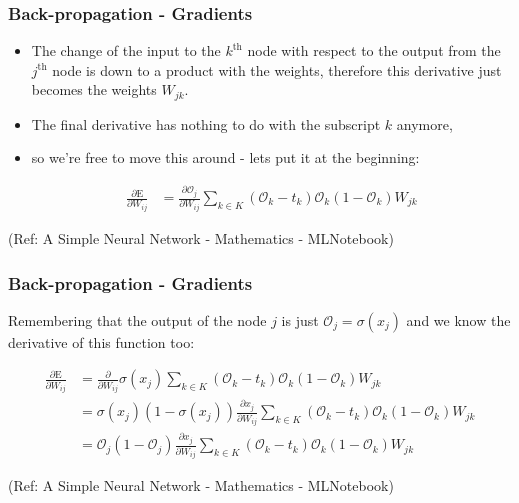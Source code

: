 \begin{frame}[fragile] \frametitle{Back-propagation - Gradients}

\begin{itemize}
\item The change of the input to the $k^{\text{th}}$ node with respect to the output from the $j^{\text{th}}$ 
node is down to a product with the weights, therefore this derivative just becomes the weights $W_{jk}$. 
\item The final derivative has nothing to do with the subscript $k$ anymore, 
\item so we’re free to move this around - lets put it at the beginning:

\begin{align}
\frac{\partial{\text{E}}}{\partial{W_{ij}}} &= \frac{\partial{\mathcal{O}_{j}}}{\partial{W_{ij}}}  \sum_{k \in K} \left( \mathcal{O}_{k} - t_{k} \right) \mathcal{O}_{k} \left( 1 - \mathcal{O}_{k} \right) W_{jk}
 \end{align}

\end{itemize}

\tiny{(Ref: A Simple Neural Network - Mathematics - MLNotebook)}
\end{frame}

\begin{frame}[fragile] \frametitle{Back-propagation - Gradients}

Remembering that the output of the node $j$ is just $\mathcal{O}_{j} = \sigma(x_{j})$ and we know the derivative of this function too:

\begin{align}
\frac{\partial{\text{E}}}{\partial{W_{ij}}} &= \frac{\partial{}}{\partial{W_{ij}}}\sigma(x_{j})  \sum_{k \in K} \left( \mathcal{O}_{k} - t_{k} \right) \mathcal{O}_{k} \left( 1 - \mathcal{O}_{k} \right) W_{jk} \\
&= \sigma(x_{j}) \left( 1 - \sigma(x_{j}) \right)  \frac{\partial{x_{j} }}{\partial{W_{ij}}} \sum_{k \in K} \left( \mathcal{O}_{k} - t_{k} \right) \mathcal{O}_{k} \left( 1 - \mathcal{O}_{k} \right) W_{jk} \\
&= \mathcal{O}_{j} \left( 1 - \mathcal{O}_{j} \right)  \frac{\partial{x_{j} }}{\partial{W_{ij}}} \sum_{k \in K} \left( \mathcal{O}_{k} - t_{k} \right) \mathcal{O}_{k} \left( 1 - \mathcal{O}_{k} \right) W_{jk}
 \end{align}
 

\tiny{(Ref: A Simple Neural Network - Mathematics - MLNotebook)}
\end{frame}

